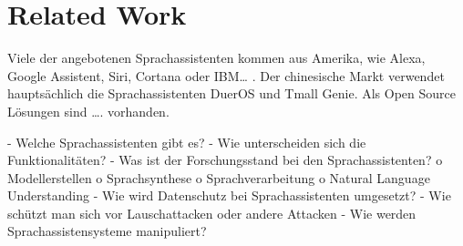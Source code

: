 \section{Related Work}

Viele der angebotenen Sprachassistenten kommen aus Amerika, wie Alexa, Google Assistent, Siri, Cortana oder IBM… . Der chinesische Markt verwendet hauptsächlich die Sprachassistenten DuerOS und Tmall Genie. Als Open Source Lösungen sind …. vorhanden. 

-	Welche Sprachassistenten gibt es?
-	Wie unterscheiden sich die Funktionalitäten?
-	Was ist der Forschungsstand bei den Sprachassistenten?
o	Modellerstellen
o	Sprachsynthese
o	Sprachverarbeitung
o	Natural Language Understanding
-	Wie wird Datenschutz bei Sprachassistenten umgesetzt?
-	Wie schützt man sich vor Lauschattacken oder andere Attacken 
-	Wie werden Sprachassistensysteme manipuliert?
